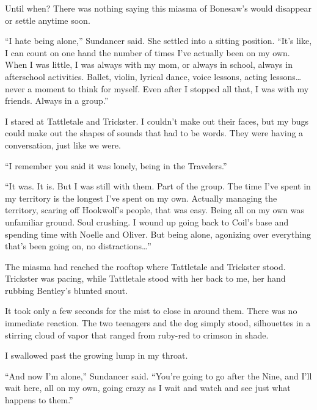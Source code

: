 Until when?  There was nothing saying this miasma of Bonesaw's would disappear or settle anytime soon.



``I hate being alone,'' Sundancer said.  She settled into a sitting position.  ``It's like, I can count on one hand the number of times I've actually been on my own.  When I was little, I was always with my mom, or always in school, always in afterschool activities.  Ballet, violin, lyrical dance, voice lessons, acting lessons\ldots never a moment to think for myself.  Even after I stopped all that, I was with my friends.  Always in a group.''



I stared at Tattletale and Trickster.  I couldn't make out their faces, but my bugs could make out the shapes of sounds that had to be words.  They were having a conversation, just like we were.



``I remember you said it was lonely, being in the Travelers.''



``It was.  It is.  But I was still with them.  Part of the group.  The time I've spent in my territory is the longest I've spent on my own.  Actually managing the territory, scaring off Hookwolf's people, that was easy.  Being all on my own was unfamiliar ground.  Soul crushing.  I wound up going back to Coil's base and spending time with Noelle and Oliver.  But being alone, agonizing over everything that's been going on, no distractions\ldots''



The miasma had reached the rooftop where Tattletale and Trickster stood.  Trickster was pacing, while Tattletale stood with her back to me, her hand rubbing Bentley's blunted snout.



It took only a few seconds for the mist to close in around them.  There was no immediate reaction.  The two teenagers and the dog simply stood, silhouettes in a stirring cloud of vapor that ranged from ruby-red to crimson in shade.



I swallowed past the growing lump in my throat.



``And now I'm alone,'' Sundancer said.  ``You're going to go after the Nine, and I'll wait here, all on my own, going crazy as I wait and watch and see just what happens to them.''



